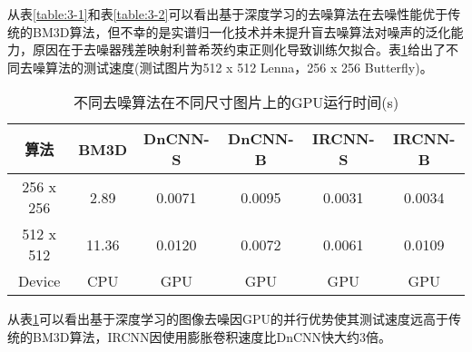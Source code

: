 从表\ref{table:3-1}和表\ref{table:3-2}可以看出基于深度学习的去噪算法在去噪性能优于传统的BM3D算法，但不幸的是实谱归一化技术并未提升盲去噪算法对噪声的泛化能力，原因在于去噪器残差映射利普希茨约束正则化导致训练欠拟合。表\ref{table:3-3}给出了不同去噪算法的测试速度(测试图片为512 x 512 Lenna，256 x 256 Butterfly)。
\begin{table}[!htbp]
	\def\arraystretch{1.4}\centering{}
	\caption{不同去噪算法在不同尺寸图片上的GPU运行时间(s)}
	\label{table:3-3}
	\begin{tabular*}{\linewidth}{@{}@{\extracolsep{\fill}}cccccc@{}}
		\toprule
		算法			   & BM3D & DnCNN-S & DnCNN-B & IRCNN-S & IRCNN-B \\
		\midrule
		256 x 256        & 2.89   & 0.0071  & 0.0095 &\color{red}0.0031 & 0.0034 \\
		512 x 512        & 11.36   & 0.0120  & 0.0072 &\color{red}0.0061 & 0.0109 \\
		Device	         & CPU   & GPU  & GPU & GPU & GPU \\
		\bottomrule
	\end{tabular*}
\end{table}

从表\ref{table:3-3}可以看出基于深度学习的图像去噪因GPU的并行优势使其测试速度远高于传统的BM3D算法，IRCNN因使用膨胀卷积速度比DnCNN快大约3倍。

